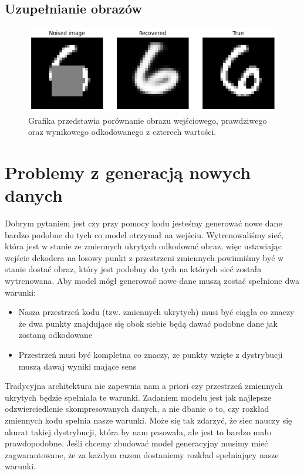 \documentclass[a4paper,12pt]{book} %
\begin{document}
\subsection{Uzupełnianie obrazów}
\lipsum[1-2]
\begin{figure}[h]
	\centering\includegraphics[width=14.5cm]{pictures/completion1.png}
	\caption{Grafika przedstawia porównanie obrazu wejściowego, prawdziwego oraz wynikowego odkodowanego z czterech wartości.}
\end{figure}

\section{Problemy z generacją nowych danych}
Dobrym pytaniem jest czy przy pomocy kodu jesteśmy generować nowe dane bardzo podobne do tych co model otrzymał na wejściu. Wytrenowaliśmy sieć, która jest w stanie ze zmiennych ukrytych odkodować obraz, więc ustawiając wejście dekodera na losowy punkt z przestrzeni zmiennych powinniśmy być w stanie dostać obraz, który jest podobny do tych na których sieć została wytrenowana.
Aby model mógł generować nowe dane muszą zostać spełnione dwa warunki:
\begin{itemize}
	\item Nasza przestrzeń kodu (tzw. zmiennych ukrytych) musi być ciągła co znaczy że dwa punkty znajdujące się obok siebie będą dawać podobne dane jak zostaną odkodowane
	\item Przestrzeń musi być kompletna co znaczy, ze punkty wzięte z dystrybucji muszą dawaj wyniki mające sens
\end{itemize}
Tradycyjna architektura nie zapewnia nam a priori czy przestrzeń zmiennych ukrytych będzie spełniała te warunki. Zadaniem modelu jest jak najlepsze odzwierciedlenie skompresowanych danych, a nie dbanie o to, czy rozkład zmiennych kodu spełnia nasze warunki. Może się tak zdarzyć, że siec nauczy się akurat takiej dystrybucji, która by nam pasowała, ale jest to bardzo mało prawdopodobne. Jeśli chcemy zbudować model generacyjny musimy mieć zagwarantowane, że za każdym razem dostaniemy rozkład spełniający nasze warunki. 
\end{document}
